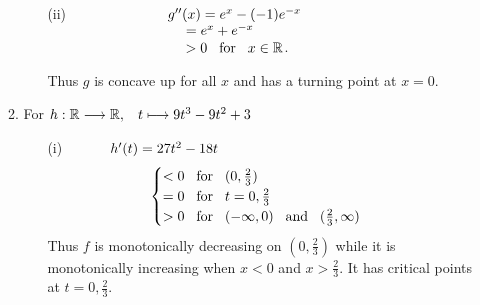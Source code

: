 \documentclass[12pt]{amsart}
\begin{document}
\begin{enumerate}
\begin{enumerate}
\begin{enumerate}
					\item[(ii)] $\text{ } \hspace{2.3cm} g''(x) = e^x-(-1)e^{-x}$ \\
					$\text{ } \hspace{3.25cm} = e^x+e^{-x}$ \\ 
					$\text{ }\hspace{3.25cm} > 0 \hspace{0.3cm} \text{for} \hspace{0.3cm} x \in
					\mathbb{R}$.
						
					Thus $g$ is concave up for all $x$ and has a turning point at $x=0$. \\
					 
				\end{enumerate}

			\item For $h: \mathbb{R} \longrightarrow \mathbb{R}, \hspace{0.3cm} t \longmapsto 
			9t^3-9t^2+3$
			
				\begin{enumerate}
					\item[(i)] $\text{ } \hspace{0.96cm} h'(t) = 27t^2-18t$
						\begin{align}
							\begin{cases}
								< 0 \hspace{0.3cm} \text{for} \hspace{0.3cm} (0,\frac{2}{3}) \notag \\
								= 0 \hspace{0.3cm} \text{for} \hspace{0.3cm} t=0,\frac{2}{3} \notag \\
								> 0 \hspace{0.3cm} \text{for} \hspace{0.3cm} (-\infty,0) 
								\hspace{0.3cm} \text{and} \hspace{0.3cm} (\frac{2}{3}, \infty) \notag
							\end{cases}
						\end{align} 
						Thus $f$ is monotonically decreasing on $(0,\frac{2}{3})$ while it is 									monotonically increasing when $x<0$ and $x>\frac{2}{3}$. It has critical points 						at $t=0, \frac{2}{3}$. \\
										

\end{enumerate}
\end{enumerate}
\end{enumerate}
\end{document}
